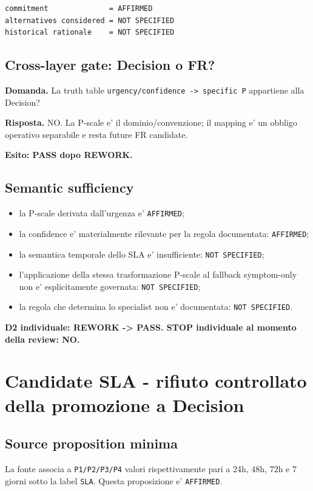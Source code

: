 \documentclass[11pt,a4paper]{article}
\begin{document}
\begin{lstlisting}
commitment              = AFFIRMED
alternatives considered = NOT SPECIFIED
historical rationale    = NOT SPECIFIED
\end{lstlisting}

\subsection{Cross-layer gate: Decision o FR?}
\begin{ddtacheck}
\textbf{Domanda.} La truth table \texttt{urgency/confidence -> specific P} appartiene alla Decision?
\end{ddtacheck}
\textbf{Risposta.} NO. La P-scale e' il dominio/convenzione; il mapping e' un obbligo operativo separabile e resta future FR candidate.\par
\textbf{Esito: PASS dopo REWORK.}

\subsection{Semantic sufficiency}
\begin{itemize}
  \item la P-scale derivata dall'urgenza e' \texttt{AFFIRMED};
  \item la confidence e' materialmente rilevante per la regola documentata: \texttt{AFFIRMED};
  \item la semantica temporale dello SLA e' insufficiente: \texttt{NOT SPECIFIED};
  \item l'applicazione della stessa trasformazione P-scale al fallback symptom-only non e' esplicitamente governata: \texttt{NOT SPECIFIED};
  \item la regola che determina lo specialist non e' documentata: \texttt{NOT SPECIFIED}.
\end{itemize}

\textbf{D2 individuale: REWORK -> PASS. STOP individuale al momento della review: NO.}

\section{Candidate SLA - rifiuto controllato della promozione a Decision}
\holdouttag

\subsection{Source proposition minima}
La fonte associa a \texttt{P1/P2/P3/P4} valori rispettivamente pari a 24h, 48h, 72h e 7 giorni sotto la label \texttt{SLA}. Questa proposizione e' \texttt{AFFIRMED}.
\end{document}
